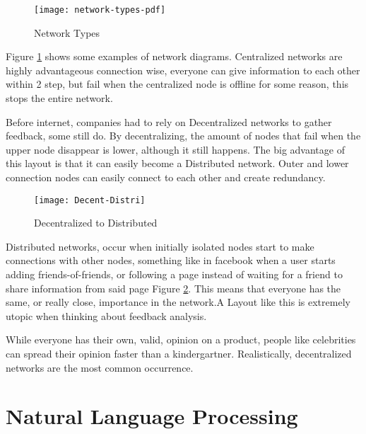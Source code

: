
\begin{figure}[htbp]
	\centering
	\texttt{[image: network-types-pdf]}
	\caption{Network Types}
	\label{fig:NetworkTypesImg}
\end{figure}

Figure \ref{fig:NetworkTypesImg} shows some examples of network diagrams. Centralized networks are highly advantageous  connection wise, everyone can give information to each other within 2 step, but fail when the centralized node is offline for some reason, this stops the entire network.
\par
Before internet, companies had to rely on Decentralized networks to gather feedback, some still do. By decentralizing, the amount of nodes that fail when the upper node disappear is lower, although it still happens. The big advantage of this layout is that it can easily become a Distributed network. Outer and lower connection nodes can easily connect to each other and create redundancy. 
\begin{figure}[htbp]
	\centering
	\texttt{[image: Decent-Distri]}
	\caption{Decentralized to Distributed}
	\label{fig:Decent-Distri}
\end{figure}

\par
Distributed networks, occur when initially isolated nodes start to make connections with other nodes, something like in facebook when a user starts adding friends-of-friends, or following a page instead of waiting for a friend to share information from said page Figure \ref{fig:Decent-Distri}. This means that everyone has the same, or really close, importance in the network.A Layout like this is extremely utopic when thinking about feedback analysis. 
\par
While everyone has their own, valid, opinion on a product, people like celebrities can spread their opinion faster than a kindergartner. Realistically, decentralized networks are the most common occurrence.
\par





\section{Natural Language Processing}
\par 



